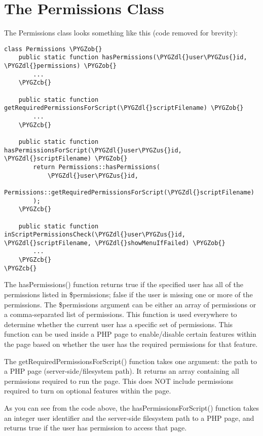 \documentclass[letterpaper,10pt,english]{sphinxmanual}
\def\PYGZus{\char`\_}
\def\PYGZob{\char`\{}
\def\PYGZcb{\char`\}}
\def\PYGZdl{\char`\$}
\begin{document}
\section{The Permissions Class}
\label{jaxFrameworkGuide:the-permissions-class}
The Permissions class looks something like this (code removed for brevity):

\begin{Verbatim}[commandchars=\\\{\}]
class Permissions \PYGZob{}
    public static function hasPermissions(\PYGZdl{}user\PYGZus{}id, \PYGZdl{}permissions) \PYGZob{}
        ...
    \PYGZcb{}

    public static function getRequiredPermissionsForScript(\PYGZdl{}scriptFilename) \PYGZob{}
        ...
    \PYGZcb{}

    public static function hasPermissionsForScript(\PYGZdl{}user\PYGZus{}id, \PYGZdl{}scriptFilename) \PYGZob{}
        return Permissions::hasPermissions(
            \PYGZdl{}user\PYGZus{}id,
            Permissions::getRequiredPermissionsForScript(\PYGZdl{}scriptFilename)
        );
    \PYGZcb{}

    public static function inScriptPermissionsCheck(\PYGZdl{}user\PYGZus{}id, \PYGZdl{}scriptFilename, \PYGZdl{}showMenuIfFailed) \PYGZob{}
        ...
    \PYGZcb{}
\PYGZcb{}
\end{Verbatim}

The hasPermissions() function returns true if the specified user has all of the permissions listed
in \$permissions; false if the user is missing one or more of the permissions. The \$permissions
argument can be either an array of permissions or a comma-separated list of permissions.  This
function is used everywhere to determine whether the current user has a specific set of permissions.
This function can be used inside a PHP page to enable/disable certain features within the page based
on whether the user has the required permissions for that feature.

The getRequiredPermissionsForScript() function takes one argument: the path to a PHP page
(server-side/filesystem path).  It returns an array containing all permissions required to run the
page.  This does NOT include permissions required to turn on optional features within the page.

As you can see from the code above, the hasPermissionsForScript() function takes an integer user
identifier and the server-side filesystem path to a PHP page, and returns true if the user has
permission to access that page.
\end{document}

